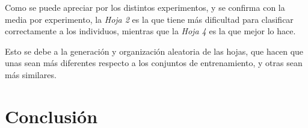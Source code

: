 \documentclass{uc3mpracticas}
\begin{document}
Como se puede apreciar por los distintos experimentos, y se confirma con la media por experimento, la \textit{Hoja 2} es la que tiene más dificultad para clasificar correctamente a los individuos, mientras que la \textit{Hoja 4} es la que mejor lo hace.

\vspace{1mm}

Esto se debe a la generación y organización aleatoria de las hojas, que hacen que unas sean más diferentes respecto a los conjuntos de entrenamiento, y otras sean más similares.





\section{Conclusión}
\end{document}
